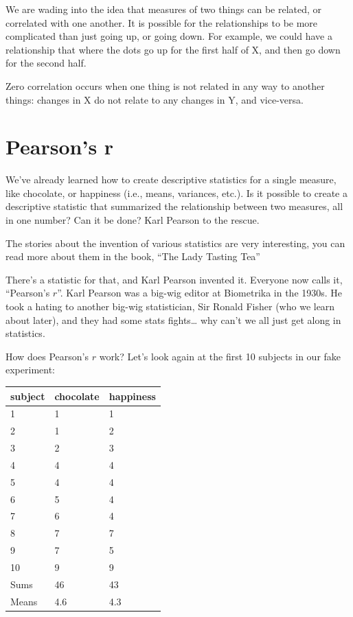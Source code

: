 \documentclass[
]{book}
\begin{document}
We are wading into the idea that measures of two things can be related, or correlated with one another. It is possible for the relationships to be more complicated than just going up, or going down. For example, we could have a relationship that where the dots go up for the first half of X, and then go down for the second half.

Zero correlation occurs when one thing is not related in any way to another things: changes in X do not relate to any changes in Y, and vice-versa.

\section{Pearson's r}\label{pearsons-r}

We've already learned how to create descriptive statistics for a single measure, like chocolate, or happiness (i.e., means, variances, etc.). Is it possible to create a descriptive statistic that summarized the relationship between two measures, all in one number? Can it be done? Karl Pearson to the rescue.

The stories about the invention of various statistics are very interesting, you can read more about them in the book, ``The Lady Tasting Tea'' \citep{salsburg2001lady}

There's a statistic for that, and Karl Pearson invented it. Everyone now calls it, ``Pearson's \(r\)''. Karl Pearson was a big-wig editor at Biometrika in the 1930s. He took a hating to another big-wig statistician, Sir Ronald Fisher (who we learn about later), and they had some stats fights\ldots{} why can't we all just get along in statistics.

How does Pearson's \(r\) work? Let's look again at the first 10 subjects in our fake experiment:

\begin{tabular}{l|l|l}
\hline
subject & chocolate & happiness\\
\hline
1 & 1 & 1\\
\hline
2 & 1 & 2\\
\hline
3 & 2 & 3\\
\hline
4 & 4 & 4\\
\hline
5 & 4 & 4\\
\hline
6 & 5 & 4\\
\hline
7 & 6 & 4\\
\hline
8 & 7 & 7\\
\hline
9 & 7 & 5\\
\hline
10 & 9 & 9\\
\hline
Sums & 46 & 43\\
\hline
Means & 4.6 & 4.3\\
\hline
\end{tabular}
\end{document}
